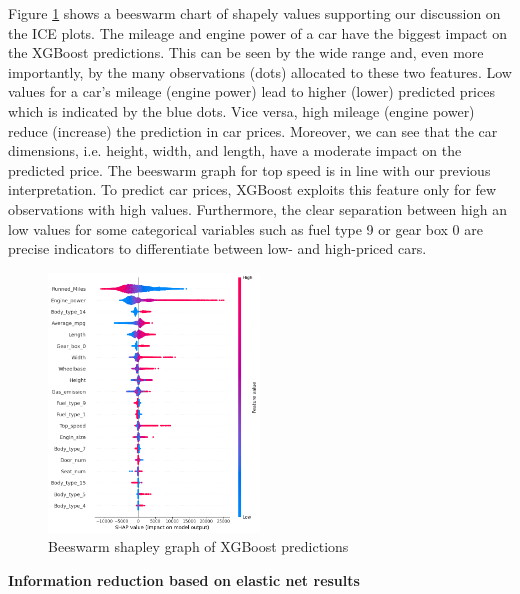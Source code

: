 \documentclass[12pt]{article}
\begin{document}
Figure \ref{xgboostshapley} shows a beeswarm chart of shapely values supporting our discussion on the ICE plots. The mileage and engine power of a car have the biggest impact on the XGBoost predictions. This can be seen by the wide range and, even more importantly, by the many observations (dots) allocated to these two features. Low values for a car's mileage (engine power) lead to higher (lower) predicted prices which is indicated by the blue dots. Vice versa, high mileage (engine power) reduce (increase) the prediction in car prices. Moreover, we can see that the car dimensions, i.e. height, width, and length, have a moderate impact on the predicted price. The beeswarm graph for top speed is in line with our previous interpretation. To predict car prices, XGBoost exploits this feature only for few observations with high values. Furthermore, the clear separation between high an low values for some categorical variables such as fuel type 9 or gear box 0 are precise indicators to differentiate between low- and high-priced cars. 

\FloatBarrier
\begin{figure}[ht]
    \centering
    \includegraphics[width=0.5\textwidth]{xgboostshapely.png}
    \caption{Beeswarm shapley graph of XGBoost predictions}
    \label{xgboostshapley}
\end{figure}
\FloatBarrier

\noindent \textbf{Information reduction based on elastic net results} \\
\end{document}
